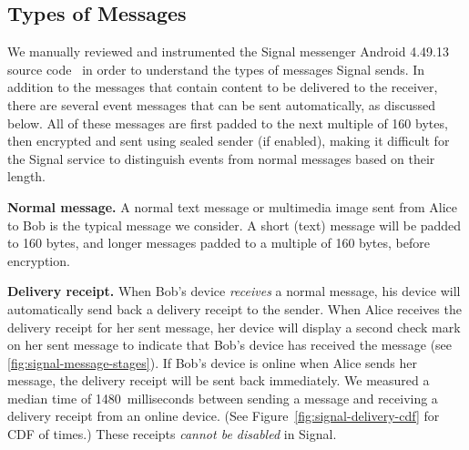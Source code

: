 \subsection{Types of Messages}
\label{sec:signal-message-types}

We manually reviewed and instrumented the Signal messenger Android
4.49.13 source code~\cite{signal-source} in order to understand the types of
messages Signal sends. In addition to the messages that contain content to be
delivered to the receiver, there are several event messages that can be sent
automatically, as discussed below. All of these messages are first padded to the
next multiple of 160 bytes, then encrypted and sent using sealed sender (if
enabled), making it difficult for the Signal service to distinguish events from
normal messages based on their length. %

\SealedSenderStructure

\MessageStages

\medskip \noindent
\textbf{Normal message.}
A normal text message or multimedia image sent from Alice to Bob is the
typical message we consider. A short (text) message will be padded to
160 bytes, and longer messages padded to a multiple of 160 bytes, before
encryption.


\medskip \noindent
\textbf{Delivery receipt.} 
When Bob's device \emph{receives} a normal message, his device will
automatically send back a delivery receipt to the sender. When Alice receives
the delivery receipt for her sent message, her device will display a second
check mark on her sent message to indicate that Bob's device has received the
message (see \cref{fig:signal-message-stages}). If Bob's device is online when Alice sends her message, the delivery receipt will be sent back immediately. 
We measured a median time of 1480~milliseconds between sending a message and receiving a delivery receipt from an online device. (See Figure~\ref{fig:signal-delivery-cdf} for CDF of times.)
These receipts
{\em cannot be disabled} in Signal.
\DeliveryTimeCDF

